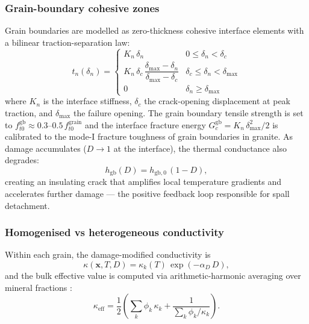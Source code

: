 \documentclass[12pt, a4paper]{article}
\newcommand{\vv}[1]{\bm{#1}}
\begin{document}
\subsubsection{Grain-boundary cohesive zones}

Grain boundaries are modelled as zero-thickness cohesive interface elements with
a bilinear traction-separation law:
\begin{equation}
    t_n(\delta_n) =
    \begin{cases}
        K_n\,\delta_n & 0 \le \delta_n < \delta_c \\
        K_n\,\delta_c\,\dfrac{\delta_\mathrm{max} - \delta_n}
                              {\delta_\mathrm{max} - \delta_c}
        & \delta_c \le \delta_n < \delta_\mathrm{max} \\
        0 & \delta_n \ge \delta_\mathrm{max}
    \end{cases}
    \label{eq:czm}
\end{equation}
where $K_n$ is the interface stiffness, $\delta_c$ the crack-opening displacement
at peak traction, and $\delta_\mathrm{max}$ the failure opening.  The grain
boundary tensile strength is set to $f_{t0}^\mathrm{gb} \approx 0.3$--$0.5\,
f_{t0}^\mathrm{grain}$ and the interface fracture energy
$G_c^\mathrm{gb} = K_n\,\delta_\mathrm{max}^2/2$ is calibrated to the mode-I
fracture toughness of grain boundaries in granite.  As damage accumulates ($D
\to 1$ at the interface), the thermal conductance also degrades:
\begin{equation}
    h_\mathrm{gb}(D) = h_{\mathrm{gb},0}\,(1-D),
    \label{eq:gb_conductance}
\end{equation}
creating an insulating crack that amplifies local temperature gradients and
accelerates further damage — the positive feedback loop responsible for spall
detachment.

\subsubsection{Homogenised vs heterogeneous conductivity}

Within each grain, the damage-modified conductivity is
\begin{equation}
    \kappa(\vv{x},T,D) = \kappa_k(T)\,\exp(-\alpha_D\,D),
    \label{eq:kappa_damage}
\end{equation}
and the bulk effective value is computed via arithmetic-harmonic averaging over
mineral fractions \citep{vogler2020simulation}:
\begin{equation}
    \kappa_\mathrm{eff} = \frac{1}{2}\!\left(
        \sum_k \phi_k\,\kappa_k
        + \frac{1}{\displaystyle\sum_k \phi_k/\kappa_k}
    \right).
    \label{eq:keff}
\end{equation}
\end{document}

